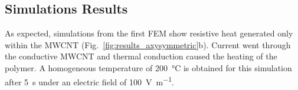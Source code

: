 \begin{table}[h]
	\center
	\caption{Material properties, unless noted, the properties for PEI are taken from SABIC's technical documentation}
	\label{tab:material_properties}
\end{table}

\FloatBarrier
\subsection*{Simulations Results}

As expected, simulations from the first FEM show resistive heat generated only within the MWCNT (Fig.~\ref{fig:results_axysymmetric}b). 
Current went through the conductive MWCNT and thermal conduction caused the heating of the polymer. 
A homogeneous temperature of \SI{200}{\celsius} is obtained for this simulation after \SI{5}{\second} under an electric field of \SI{100}{\volt\per\metre}. 

